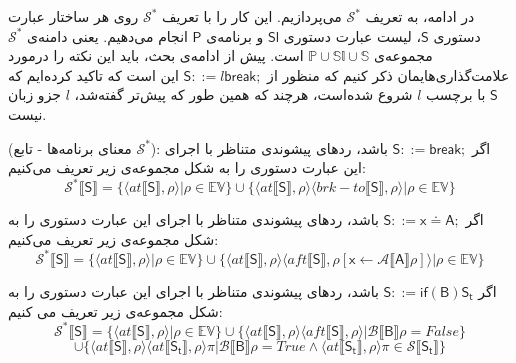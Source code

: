 در ادامه، به تعریف $\mathcal{S^*}$ می‌پردازیم. این کار را با تعریف $\mathcal{S^*}$ روی هر ساختار عبارت دستوری $\mathsf{S}$، لیست عبارت دستوری $\mathsf{Sl}$ و برنامه‌ی $\mathsf{P}$ انجام می‌دهیم. یعنی دامنه‌ی $\mathcal{S}^*$ مجموعه‌ی $\mathbb{P}\cup \mathbb{Sl}\cup\mathbb{S}$ است.
پیش از ادامه‌ی بحث، باید این نکته را در‌مورد علامت‌گذاری‌هایمان ذکر کنیم که منظور از $        \mathsf{S} ::= l \mathsf{break;}  $ این است که تاکید کرده‌ایم که $\mathsf{S}$ با برچسب $l$ شروع شده‌است، هرچند که همین طور که پیش‌تر گفته‌شد،   $l$ جزو زبان نیست.

\begin{defn}
	(معنای برنامه‌ها - تابع $\mathcal{S}^*$): 
	اگر $        \mathsf{S} ::= \mathsf{break;}  $ باشد، ردهای پیشوندی متناظر با اجرای این عبارت‌ دستوری را به شکل مجموعه‌ی زیر تعریف می‌کنیم:
	$$\mathcal{S^*} \llbracket\mathsf{S}\rrbracket = \{ \langle at\llbracket\mathsf{S}\rrbracket , \rho \rangle | \rho \in \mathbb{EV}       \} \cup     \{ \langle at\llbracket\mathsf{S}\rrbracket , \rho \rangle \langle brk-to\llbracket\mathsf{S}\rrbracket , \rho \rangle | \rho \in \mathbb{EV}       \}             $$   
	
	
	اگر $        \mathsf{S} ::=  \mathsf{x\doteq A;}  $ باشد، ردهای پیشوندی متناظر با اجرای این عبارت‌ دستوری را به شکل مجموعه‌ی زیر تعریف می‌کنیم:
	$$\mathcal{S^*} \llbracket\mathsf{S}\rrbracket = \{ \langle at\llbracket\mathsf{S}\rrbracket , \rho \rangle | \rho \in \mathbb{EV}       \} \cup     \{ \langle at\llbracket\mathsf{S}\rrbracket , \rho \rangle \langle aft\llbracket\mathsf{S}\rrbracket , \rho[\mathsf{x}\leftarrow \mathcal{A}\llbracket\mathsf{A}\rrbracket\rho] \rangle | \rho \in \mathbb{EV}       \}             $$   
	
	اگر $         \mathsf{S} ::= \mathsf{if}  \mathsf{ (B) S_t}  $ باشد، ردهای پیشوندی متناظر با اجرای این عبارت‌ دستوری را به شکل مجموعه‌ی زیر تعریف می کنیم:
	$$\mathcal{S^*} \llbracket\mathsf{S}\rrbracket = \{ \langle at\llbracket\mathsf{S}\rrbracket , \rho \rangle | \rho \in \mathbb{EV}       \} \cup     \{ \langle at\llbracket\mathsf{S}\rrbracket , \rho \rangle \langle aft\llbracket\mathsf{S}\rrbracket , \rho \rangle | \mathcal{B}\llbracket\mathsf{B}\rrbracket \rho =False      \} 
	$$$$\cup    \{ \langle at\llbracket\mathsf{S}\rrbracket , \rho \rangle \langle at\llbracket\mathsf{S_t}\rrbracket , \rho \rangle 
	\pi | \mathcal{B}\llbracket\mathsf{B}\rrbracket \rho =True  \wedge   \langle  at\llbracket\mathsf{S_t}\rrbracket  , \rho \rangle \pi \in \mathcal{S} \llbracket\mathsf{S_t}\rrbracket    \}          $$ 
	

\end{defn}
